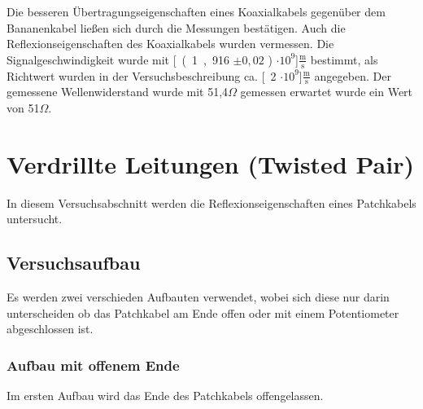 \documentclass[12pt,a4paper]{article}
\begin{document}
Die besseren Übertragungseigenschaften eines Koaxialkabels gegenüber dem Bananenkabel ließen sich durch die Messungen bestätigen. Auch die Reflexionseigenschaften des Koaxialkabels wurden vermessen. Die Signalgeschwindigkeit wurde mit \unit[(1,916 $\pm 0,02$ ) $\cdot 10^9$]{$\frac{\text{m}}{\text{s}}$} bestimmt, als Richtwert wurden in der Versuchsbeschreibung ca. \unit[2 $\cdot 10^9$]{$\frac{\text{m}}{\text{s}}$} angegeben. Der gemessene Wellenwiderstand wurde mit 51,4$\Omega$ gemessen erwartet wurde ein Wert von 51$\Omega$.




\section{Verdrillte Leitungen (Twisted Pair)}

In diesem Versuchsabschnitt werden die Reflexionseigenschaften eines Patchkabels untersucht.

\subsection{Versuchsaufbau}
Es werden zwei verschieden Aufbauten verwendet, wobei sich diese nur darin unterscheiden ob das Patchkabel am Ende offen oder mit einem Potentiometer abgeschlossen ist.

\subsubsection{Aufbau mit offenem Ende}

Im ersten Aufbau wird das Ende des Patchkabels offengelassen.
\end{document}
